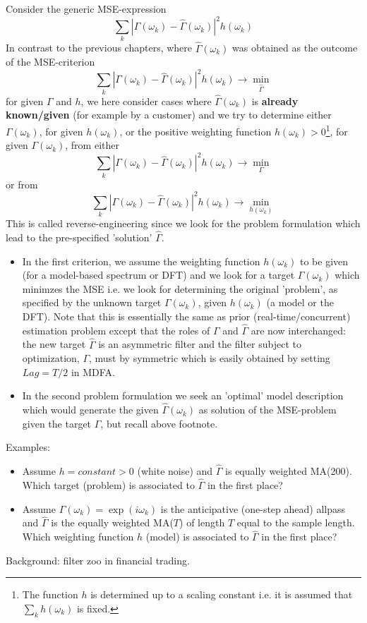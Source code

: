 \documentclass[a4paper]{book}
\begin{document}
Consider the generic MSE-expression
\[\sum_k|\Gamma(\omega_k)-\hat{\Gamma}(\omega_k)|^2h(\omega_k)\]
In contrast to the previous chapters, where $\hat{\Gamma}(\omega_k)$ was obtained as the outcome of the MSE-criterion
\[\sum_k|\Gamma(\omega_k)-\hat{\Gamma}(\omega_k)|^2h(\omega_k)\to\min_{\hat{\Gamma}}\]
for given $\Gamma$ and $h$, we here consider cases where $\hat{\Gamma}(\omega_k)$ is \textbf{already known/given} (for example by a customer) and we try to determine either $\Gamma(\omega_k)$, for given $h(\omega_k)$, or the positive weighting function $h(\omega_k)>0$\footnote{The function $h$ is determined up to a scaling constant i.e. it is assumed that $\sum_kh(\omega_k)$ is fixed.}, for given $\Gamma(\omega_k)$, from either
\[\sum_k|\Gamma(\omega_k)-\hat{\Gamma}(\omega_k)|^2h(\omega_k)\to\min_{{\Gamma}}\]
or from
\[\sum_k|\Gamma(\omega_k)-\hat{\Gamma}(\omega_k)|^2h(\omega_k)\to\min_{h(\omega_k)}\]
This is called reverse-engineering since we look for the problem formulation which lead to the pre-specified 'solution' $\hat{\Gamma}$.
\begin{itemize}
\item In the first criterion, we assume the weighting function $h(\omega_k)$ to be given (for a model-based spectrum or DFT) and we look
for a target $\Gamma(\omega_k)$ which minimzes the MSE i.e. we look for determining the original 'problem', as specified by the unknown target $\Gamma(\omega_k)$, given $h(\omega_k)$ (a model or the DFT). Note that this is essentially the same as prior (real-time/concurrent) estimation problem except that the roles of $\Gamma$ and $\hat{\Gamma}$ are now interchanged: the new target $\hat{\Gamma}$ is an asymmetric filter and the filter subject to optimization, $\Gamma$, must by symmetric which is easily obtained by setting $Lag=T/2$ in MDFA.
\item In the second problem formulation we seek an 'optimal' model description which would generate the given $\hat{\Gamma}(\omega_k)$ as solution of the MSE-problem given the target $\Gamma$, but recall above footnote. 
\end{itemize}

Examples:
\begin{itemize}
\item Assume $h=constant>0$ (white noise) and $\hat{\Gamma}$ is equally weighted MA(200). Which target (problem) is associated to $\hat{\Gamma}$ in the first place?
\item Assume $\Gamma(\omega_k)=\exp(i\omega_k)$ is the anticipative (one-step ahead) allpass and $\hat{\Gamma}$ is the equally weighted MA($T$) of length $T$ equal to the sample length. Which weighting function $h$ (model) is associated to $\hat{\Gamma}$ in the first place?
\end{itemize}
Background: filter zoo in financial trading.
\end{document}
